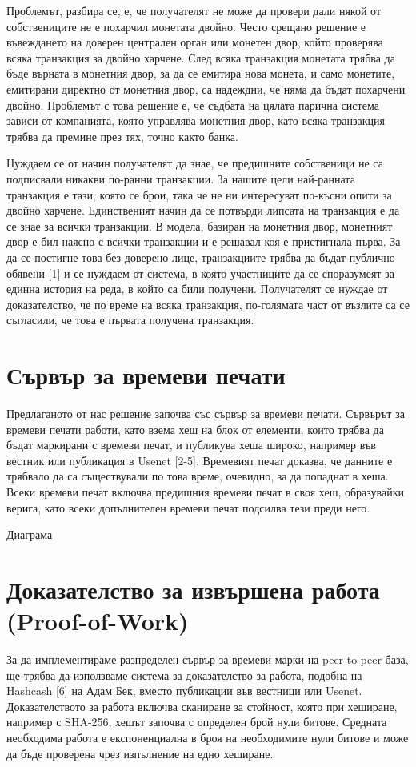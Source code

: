 \documentclass[11pt,a4paper]{article}
\begin{document}
Проблемът, разбира се, е, че получателят не може да провери дали някой от собствениците не е похарчил монетата двойно. Често срещано решение е въвеждането на доверен централен орган или монетен двор, който проверява всяка транзакция за двойно харчене. След всяка транзакция монетата трябва да бъде върната в монетния двор, за да се емитира нова монета, и само монетите, емитирани директно от монетния двор, са надеждни, че няма да бъдат похарчени двойно. Проблемът с това решение е, че съдбата на цялата парична система зависи от компанията, която управлява монетния двор, като всяка транзакция трябва да премине през тях, точно както банка.

Нуждаем се от начин получателят да знае, че предишните собственици не са подписвали никакви по-ранни транзакции. За нашите цели най-ранната транзакция е тази, която се брои, така че не ни интересуват по-късни опити за двойно харчене. Единственият начин да се потвърди липсата на транзакция е да се знае за всички транзакции. В модела, базиран на монетния двор, монетният двор е бил наясно с всички транзакции и е решавал коя е пристигнала първа. За да се постигне това без доверено лице, транзакциите трябва да бъдат публично обявени [1] и се нуждаем от система, в която участниците да се споразумеят за единна история на реда, в който са били получени. Получателят се нуждае от доказателство, че по време на всяка транзакция, по-голямата част от възлите са се съгласили, че това е първата получена транзакция.

\section{Сървър за времеви печати}
Предлаганото от нас решение започва със сървър за времеви печати. Сървърът за времеви печати работи, като взема хеш на блок от елементи, които трябва да бъдат маркирани с времеви печат, и публикува хеша широко, например във вестник или публикация в Usenet [2-5]. Времевият печат доказва, че данните е трябвало да са съществували по това време, очевидно, за да попаднат в хеша. Всеки времеви печат включва предишния времеви печат в своя хеш, образувайки верига, като всеки допълнителен времеви печат подсилва тези преди него.

Диаграма

\section{Доказателство за извършена работа (Proof-of-Work)}
За да имплементираме разпределен сървър за времеви марки на peer-to-peer база, ще трябва да използваме система за доказателство за работа, подобна на Hashcash [6] на Адам Бек, вместо публикации във вестници или Usenet. Доказателството за работа включва сканиране за стойност, която при хеширане, например с SHA-256, хешът започва с определен брой нули битове. Средната необходима работа е експоненциална в броя на необходимите нули битове и може да бъде проверена чрез изпълнение на едно хеширане.
\end{document}
